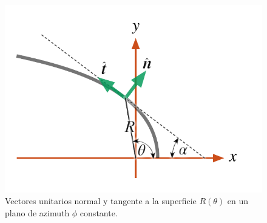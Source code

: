 \begin{figure}
  \includegraphics[width=0.6\linewidth]{./Figures/bowshock-unit-vectors}
  \caption{Vectores unitarios normal y tangente a la superficie $R(\theta)$
    en un plano de azimuth $\phi$ constante.}
    \label{fig:unit-vec}
\end{figure}

